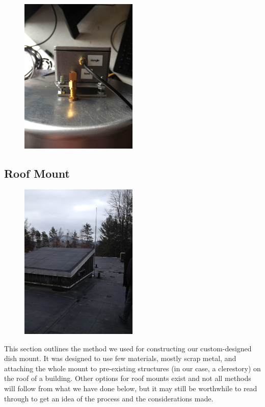 \documentclass[11pt]{article} %
\begin{document}
\begin{figure}
  \centering
  \caption{   }
  \includegraphics[width=0.50\textwidth]{feed/20.jpeg}
\end{figure}







\subsection{Roof Mount}


\begin{figure}
  \centering
  \caption{   }
  \includegraphics[width=0.50\textwidth]{roofmount/00.jpeg}
\end{figure}



This section outlines the method we used for constructing our custom-designed dish mount. It was designed to use few materials, mostly scrap metal, and attaching the whole mount to pre-existing structures (in our case, a clerestory) on the roof of a building. Other options for roof mounts exist and not all methods will follow from what we have done below, but it may still be worthwhile to read through to get an idea of the process and the considerations made.
\end{document}
